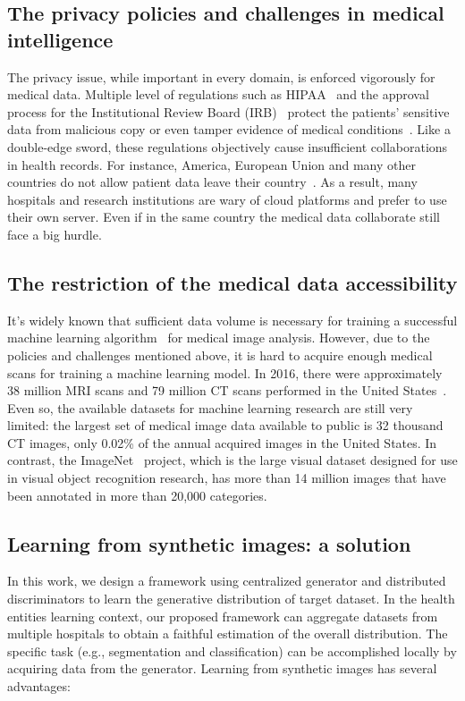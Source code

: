 \subsection{The privacy policies and challenges in medical intelligence}
The privacy issue, while important in every domain, is enforced vigorously for medical data. Multiple level of regulations such as HIPAA~\cite{annas2003hipaa,centers2003hipaa,mercuri2004hipaa,gostin2009beyond} and the approval process for the Institutional Review Board (IRB)~\cite{bankert2006institutional} protect the patients' sensitive data from malicious copy or even tamper evidence of medical conditions~\cite{mirsky2019ct}. Like a double-edge sword, these regulations objectively cause insufficient collaborations in health records.
For instance, America, European Union and many other countries do not allow patient data leave their country~\cite{kerikmae2017challenges,seddon2013cloud}. As a result, many hospitals and research institutions are wary of cloud platforms and prefer to use their own server. Even if in the same country the medical data collaborate still face a big hurdle.


\subsection{The restriction of the medical data accessibility}
It's widely known that sufficient data volume is necessary for training a successful machine learning algorithm~\cite{domingos2012few} for medical image analysis. 
However, due to the policies and challenges mentioned above, it is hard to acquire enough medical scans for training a machine learning model. In 2016, there were approximately 38 million MRI scans and 79 million CT scans performed in the United States~\cite{papanicolas2018health}. Even so, the available datasets for machine learning research are still very limited: the largest set of medical image data available to public is 32 thousand~\cite{yan2018deeplesion} CT images, only 0.02\% of the annual acquired images in the United States.
In contrast, the ImageNet~\cite{deng2009imagenet} project, which is the large visual dataset designed for use in visual object recognition research, has more than 14 million images that have been annotated in more than 20,000 categories.

\subsection{Learning from synthetic images: a solution}
In this work, we design a framework using centralized generator and distributed discriminators to learn the generative distribution of target dataset. In the health entities learning context, our proposed framework can aggregate datasets from multiple hospitals to obtain a faithful estimation of the overall distribution. The specific task (e.g., segmentation and classification) can be accomplished locally by acquiring data from the generator. Learning from synthetic images has several advantages:


